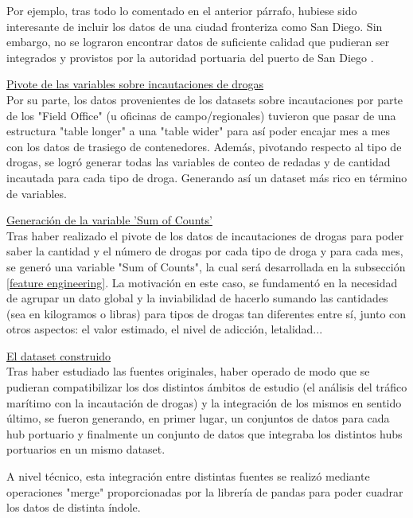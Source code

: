\documentclass[12pt]{article}
\begin{document}
		Por ejemplo, tras todo lo comentado en el anterior párrafo, hubiese sido interesante de incluir los datos de una ciudad fronteriza como San Diego. Sin embargo, no se lograron encontrar datos de suficiente calidad que pudieran ser integrados y provistos por la autoridad portuaria del puerto de San Diego \cite[San Diego Unified Port]{}.
		
		\underline{Pivote de las variables sobre incautaciones de drogas}\\
		Por su parte, los datos provenientes de los datasets sobre incautaciones por parte de los "Field Office" (u oficinas de campo/regionales) tuvieron que pasar de una estructura "table longer" a una "table wider" para así poder encajar mes a mes con los datos de trasiego de contenedores. Además, pivotando respecto al tipo de drogas, se logró generar todas las variables de conteo de redadas y de cantidad incautada para cada tipo de droga. Generando así un dataset más rico en término de variables.
		
		\underline{Generación de la variable 'Sum of Counts'}\\
		Tras haber realizado el pivote de los datos de incautaciones de drogas para poder saber la cantidad y el número de drogas por cada tipo de droga y para cada mes, se generó una variable "Sum of Counts", la cual será desarrollada en la subsección \ref{feature engineering}. La motivación en este caso, se fundamentó en la necesidad de agrupar un dato global y la inviabilidad de hacerlo sumando las cantidades (sea en kilogramos o libras) para tipos de drogas tan diferentes entre sí, junto con otros aspectos: el valor estimado, el nivel de adicción, letalidad...
		 
		\underline{El dataset construido}\\
		Tras haber estudiado las fuentes originales, haber operado de modo que se pudieran compatibilizar los dos distintos ámbitos de estudio (el análisis del tráfico marítimo con la incautación de drogas) y la integración de los mismos en sentido último, se fueron generando, en primer lugar, un conjuntos de datos para cada hub portuario y finalmente un conjunto de datos que integraba los distintos hubs portuarios en un mismo dataset.\cite{} 
		
		
		A nivel técnico, esta integración entre distintas fuentes se realizó mediante operaciones "merge" proporcionadas por la librería de pandas para poder cuadrar los datos de distinta índole.
		
\end{document}
